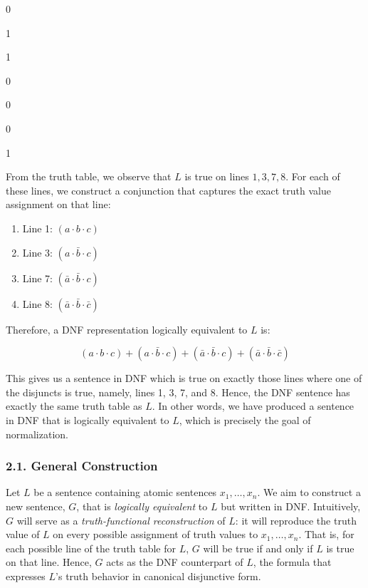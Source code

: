 0

1

1

0

0

0

1

From the truth table, we observe that \(L\) is true on lines
\(1, 3, 7, 8\). For each of these lines, we construct a conjunction that
captures the exact truth value assignment on that line:

\begin{enumerate}
\def\labelenumi{\arabic{enumi}.}
\tightlist
\item
  Line 1: \((a \cdot b \cdot c)\)
\item
  Line 3: \((a \cdot \bar b \cdot c)\)
\item
  Line 7: \((\bar a \cdot \bar b \cdot c)\)
\item
  Line 8: \((\bar a \cdot \bar b \cdot \bar c)\)
\end{enumerate}

Therefore, a DNF representation logically equivalent to \(L\) is:

\[(a \cdot b \cdot c) + (a \cdot \bar b \cdot c) + (\bar a \cdot \bar b \cdot c) + (\bar a \cdot \bar b \cdot \bar c)\]

This gives us a sentence in DNF which is true on exactly those lines
where one of the disjuncts is true, namely, lines 1, 3, 7, and 8. Hence,
the DNF sentence has exactly the same truth table as \(L\). In other
words, we have produced a sentence in DNF that is logically equivalent
to \(L\), which is precisely the goal of normalization.

\subsubsection{2.1. General Construction}\label{general-construction-1}

Let \(L\) be a sentence containing atomic sentences \(x_1, \dots, x_n\).
We aim to construct a new sentence, \(G\), that is \emph{logically
equivalent} to \(L\) but written in DNF. Intuitively, \(G\) will serve
as a \emph{truth-functional reconstruction} of \(L\): it will reproduce
the truth value of \(L\) on every possible assignment of truth values to
\(x_1, \dots, x_n\). That is, for each possible line of the truth table
for \(L\), \(G\) will be true if and only if \(L\) is true on that line.
Hence, \(G\) acts as the DNF counterpart of \(L\), the formula that
expresses \(L\)'s truth behavior in canonical disjunctive form.

